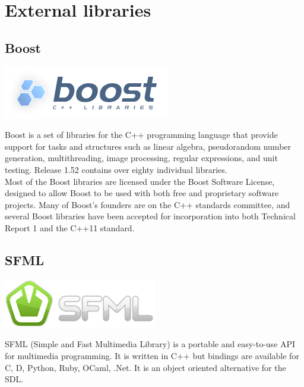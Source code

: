 \documentclass{scrreprt}
\begin{document}
		  \section{External libraries}
		  \subsection{Boost} %
		  \begin{center}
		  \includegraphics[scale=0.75]{Boost.png}
		  \end{center}
		  Boost is a set of libraries for the C++ programming language that provide support for tasks and structures such as linear algebra, pseudorandom number generation, multithreading, image processing, regular expressions, and unit testing. Release 1.52 contains over eighty individual libraries.\\

		  Most of the Boost libraries are licensed under the Boost Software License, designed to allow Boost to be used with both free and proprietary software projects. Many of Boost's founders are on the C++ standards committee, and several Boost libraries have been accepted for incorporation into both Technical Report 1 and the C++11 standard.

		  \subsection{SFML} %
		  \label{SFML}

		  \begin{center}
		  \includegraphics[scale=0.75]{SFML2.png}
		  \end{center}

		  SFML (Simple and Fast Multimedia Library) is a portable and easy-to-use API for multimedia programming. It is written in C++ but bindings are available for C, D, Python, Ruby, OCaml, .Net. It is an object oriented alternative for the SDL.\\
\end{document}
